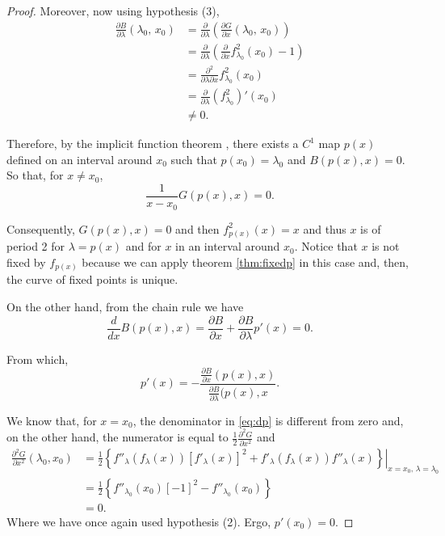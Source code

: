 \documentclass[10pt,twoside,titlepage]{book}
\numberwithin{equation}{chapter}
\numberwithin{figure}{chapter}
\numberwithin{table}{chapter}
\theoremstyle{plain}%
\theoremstyle{definition}
\theoremstyle{remark}
\begin{document}
\begin{proof}
	Moreover, now using hypothesis (3),
	\begin{equation}
		\begin{aligned}
			\frac{\partial B}{\partial \lambda}(\lambda_0,\,x_0)	& =\frac{\partial}{\partial\lambda}\left(\frac{\partial G}{\partial x}(\lambda_0,\,x_0)\right)\\
			& =\frac{\partial}{\partial\lambda}\left(\frac{\partial}{\partial x}f^2_{\lambda_0}(x_0)-1\right)\\
			& =\frac{\partial^2}{\partial\lambda\partial x}f^2_{\lambda_0}(x_0)\\
			& =\frac{\partial}{\partial\lambda}(f^2_{\lambda_0})'(x_0)\\
			& \neq 0.
		\end{aligned}
	\end{equation}
	
	Therefore, by the implicit function theorem \cite{Marsden}, there exists a $C^1$ map $p(x)$ defined on an interval around $x_0$ such that $p(x_0)=\lambda_0$ and $B(p(x),x)=0$. So that, for $x\neq x_0$,
	\[\frac{1}{x-x_0}G(p(x),x)=0.\]
	
	Consequently, $G(p(x),x)=0$ and then $f^2_{p(x)}(x)=x$ and thus $x$ is of period 2 for $\lambda=p(x)$ and for $x$ in an interval around $x_0$. Notice that $x$ is not fixed by $f_{p(x)}$ because we can apply theorem \ref{thm:fixedp} in this case and, then, the curve of fixed points is unique.
	
	On the other hand, from the chain rule we have
	\[\frac{d}{dx}B(p(x),x)=\frac{\partial B}{\partial x}+\frac{\partial B}{\partial\lambda}p'(x)=0.\]
	
	From which,
	\begin{equation}
		\label{eq:dp}
		p'(x)=-\frac{\frac{\partial B}{\partial x}(p(x),x)}{\frac{\partial B}{\partial\lambda}(p(x),x}.
	\end{equation}
	
	We know that, for $x=x_0$, the denominator in \eqref{eq:dp} is different from zero and, on the other hand, the numerator is equal to $\frac{1}{2}\frac{\partial^2 G}{\partial x^2}$ and
	\begin{equation}
		\begin{aligned}
			\frac{\partial^2 G}{\partial x^2}(\lambda_0,x_0)	& =\frac{1}{2}\left.\left\{f''_{\lambda}(f_{\lambda}(x))[f'_{\lambda}(x)]^2+f'_{\lambda}(f_{\lambda}(x))f''_{\lambda}(x)\right\}\right|_{x=x_0,\,\lambda=\lambda_0}\\
			& =\frac{1}{2}\left\{f''_{\lambda_0}(x_0)[-1]^2-f''_{\lambda_0}(x_0)\right\}\\
			& =0.
		\end{aligned}
	\end{equation}
	Where we have once again used hypothesis (2). Ergo, $p'(x_0)=0$.
\end{proof}
\end{document}
